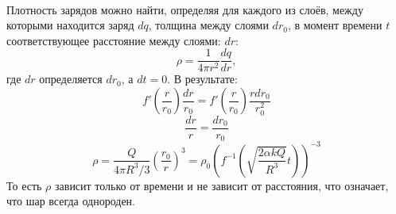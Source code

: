 \\
Плотность зарядов можно найти, определяя для каждого из слоёв, между которыми находится заряд $dq$, толщина между слоями $dr_0$, в момент времени $t$ соответствующее расстояние между слоями:
$dr$:
\[
\rho = \frac{1}{4\pi r^2} \frac{dq}{dr},
\]
где $dr$ определяется $dr_0$, а $dt = 0$. В результате:
\[
	f'\left(\frac{r}{r_0}\right) \frac{dr}{r_0} = f'\left(\frac{r}{r_0}\right) \frac{r dr_0}{r_0^2} 
\]
\[
	\frac{dr}{r} = \frac{dr_0}{r_0}
\]
\[
	\rho = \frac{Q}{4\pi R^3/3} \left(\frac{r_0}{r}\right)^3 = \rho_0 \left(f^{-1}\left(\sqrt{
		\frac{2\alpha k Q}{R^{3}} } t\right)\right)^{-3}
\]
То есть $\rho$ зависит только от времени и не зависит от расстояния, что означает, что шар всегда однороден.